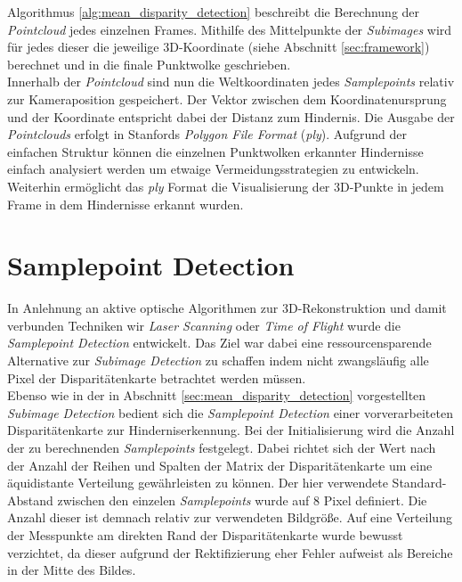 \noindent
Algorithmus \ref{alg:mean_disparity_detection} beschreibt die Berechnung der \emph{Pointcloud} jedes einzelnen Frames. Mithilfe des Mittelpunkte der \emph{Subimages} wird für jedes dieser die jeweilige 3D-Koordinate (siehe Abschnitt \ref{sec:framework}) berechnet und in die finale Punktwolke geschrieben.\\

\noindent
Innerhalb der \emph{Pointcloud} sind nun die Weltkoordinaten jedes \emph{Samplepoints} relativ zur Kameraposition gespeichert. Der Vektor zwischen dem Koordinatenursprung und der Koordinate entspricht dabei der Distanz zum Hindernis. Die Ausgabe der \emph{Pointclouds} erfolgt in Stanfords \emph{Polygon File Format} (\emph{ply}). Aufgrund der einfachen Struktur können die einzelnen Punktwolken erkannter Hindernisse einfach analysiert werden um etwaige Vermeidungsstrategien zu entwickeln. Weiterhin ermöglicht das \emph{ply} Format die Visualisierung der 3D-Punkte in jedem Frame in dem Hindernisse erkannt wurden.

\section{Samplepoint Detection}
\label{sec:samplepoint_detection}
In Anlehnung an aktive optische Algorithmen zur 3D-Rekonstruktion und damit verbunden Techniken wir \emph{Laser Scanning} oder \emph{Time of Flight} wurde die \emph{Samplepoint Detection} entwickelt. Das Ziel war dabei eine ressourcensparende Alternative zur \emph{Subimage Detection} zu schaffen indem nicht zwangsläufig alle Pixel der Disparitätenkarte betrachtet werden müssen.\\

\noindent
Ebenso wie in der in Abschnitt \ref{sec:mean_disparity_detection} vorgestellten \emph{Subimage Detection} bedient sich die \emph{Samplepoint Detection} einer vorverarbeiteten Disparitätenkarte zur Hinderniserkennung. Bei der Initialisierung wird die Anzahl der zu berechnenden \emph{Samplepoints} festgelegt. Dabei richtet sich der Wert nach der Anzahl der Reihen und Spalten der Matrix der Disparitätenkarte um eine äquidistante Verteilung gewährleisten zu können. Der hier verwendete Standard-Abstand zwischen den einzelen \emph{Samplepoints} wurde auf 8 Pixel definiert. Die Anzahl dieser ist demnach relativ zur verwendeten Bildgröße. Auf eine Verteilung der Messpunkte am direkten Rand der Disparitätenkarte wurde bewusst verzichtet, da dieser aufgrund der Rektifizierung eher Fehler aufweist als Bereiche in der Mitte des Bildes.\\


